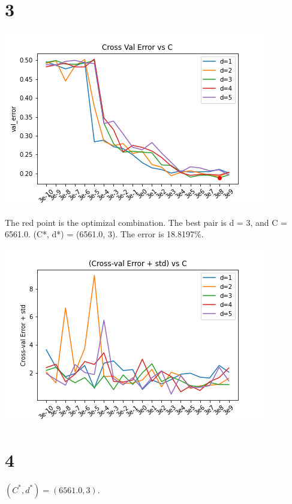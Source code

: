 \documentclass{article}
\begin{document}
\section*{3}
\includegraphics[width=\textwidth]{images/C3_cross_val_error_vs_d.png}

The red point is the optimizal combination. The best pair is d = 3, and C = 6561.0. (C*, d*) = (6561.0, 3). The error is 18.8197\%.


\includegraphics[width=\textwidth]{./images/C3_cross_val_error_plus_std_vs_d.png}


\section*{4}

$(C^*, d^*) = (6561.0, 3)$.
\end{document}
